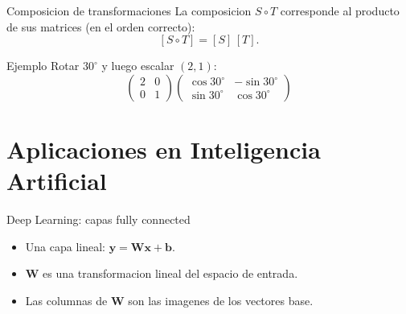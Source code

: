 \documentclass[aspectratio=169, 10pt, xcolor=table]{beamer}
\begin{document}
\begin{frame}{Composicion de transformaciones}
    La composicion $S\circ T$ corresponde al producto de sus matrices (en el orden correcto):
    \[
    [S\circ T] = [S]\,[T].
    \]
    \begin{exampleblock}{Ejemplo}
        Rotar $30^\circ$ y luego escalar $(2,1)$:
        \[
        \begin{pmatrix}2&0\\0&1\end{pmatrix}
        \begin{pmatrix}\cos30^\circ&-\sin30^\circ\\ \sin30^\circ&\cos30^\circ\end{pmatrix}
        \]
    \end{exampleblock}
\end{frame}

\section{Aplicaciones en Inteligencia Artificial}

\begin{frame}{Deep Learning: capas fully connected}
    \begin{itemize}
        \item Una capa lineal: $\mathbf{y} = \mathbf{W}\mathbf{x} + \mathbf{b}$.
        \item $\mathbf{W}$ es una transformacion lineal del espacio de entrada.
        \item Las columnas de $\mathbf{W}$ son las imagenes de los vectores base.
    \end{itemize}
    \begin{center}
    \end{center}
\end{frame}
\end{document}
